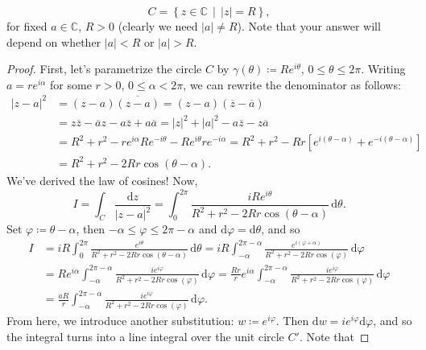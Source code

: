 \documentclass[12pt]{article}
\newcommand{\cx}{\mathbb{C}}
\newcommand\paren[1]{\left( #1 \right)}
\newcommand\setb[1]{\left \{ #1 \right \}}
\newcommand{\sqbrack}[1]{\left [ #1 \right ]}
\newcommand{\abs}[1]{\left| #1 \right|}
\theoremstyle{definition}
\begin{document}
\begin{enumerate}
    \[
        C = \setb{ z \in \cx \, \middle| \, \abs{z} = R } , 
    \]
    for fixed $a \in \cx$, $R > 0$ (clearly we need $|a| \neq R$). Note that your answer will depend on whether $|a| < R$ or $|a| > R$.
    \begin{proof}
        First, let's parametrize the circle $C$ by $\gamma(\theta) \coloneqq Re^{i\theta}$, $0 \leq \theta \leq 2\pi$. Writing $a = re^{i\alpha}$ for some $r > 0$, $0 \leq \alpha < 2\pi$, we can rewrite the denominator as follows:
        \begin{align*}
            \abs{z - a}^2 & = \paren{z - a} \overline{ \paren{ z - a } } = \paren{z - a} \paren{ \overline{z} - \overline{a} } \\ 
            & = z \overline{z} - \overline{a} z - a \overline{z} + a \overline{a} = \abs{z}^2 + \abs{a}^2 - a \overline{z} - z \overline{a} \\ 
            & = R^2 + r^2 - re^{i \alpha} Re^{-i\theta} - Re^{i\theta} re^{-i\alpha} = R^2 + r^2 - Rr \sqbrack{ e^{i \paren{ \theta - \alpha } } + e^{-i \paren{ \theta - \alpha } } } \\ 
            & = R^2 + r^2 - 2Rr \cos \paren{ \theta - \alpha } .
        \end{align*}
        We've derived the law of cosines! Now,
        \[
            I = \int_C \frac{\mathrm{d}z}{\abs{z-a}^2}  = \int_{0}^{2\pi} \frac{i R e^{i\theta}}{R^2 + r^2 -2Rr \cos \paren{ \theta - \alpha } } \, \mathrm{d}\theta.
        \]
        Set $\varphi \coloneqq \theta - \alpha$, then $-\alpha \leq \varphi \leq 2 \pi - \alpha$ and $\mathrm{d}\varphi = \mathrm{d}\theta$, and so 
        \begin{align*}
            I & = i R \int_{0}^{2\pi} \frac{ e^{i\theta}}{R^2 + r^2 -2Rr \cos \paren{ \theta - \alpha } } \, \mathrm{d}\theta = i R \int_{-\alpha}^{2\pi - \alpha} \frac{ e^{i \paren{ \varphi + \alpha } }}{R^2 + r^2 -2Rr \cos \paren{ \varphi } } \, \mathrm{d}\varphi \\ 
            & = R e^{i\alpha} \int_{-\alpha}^{2\pi - \alpha} \frac{ i e^{i \varphi }}{R^2 + r^2 -2Rr \cos \paren{ \varphi } } \, \mathrm{d}\varphi = \frac{Rr}{r} e^{i\alpha} \int_{-\alpha}^{2\pi - \alpha} \frac{ i e^{i \varphi }}{R^2 + r^2 -2Rr \cos \paren{ \varphi } } \, \mathrm{d}\varphi \\ 
            & = \frac{aR}{r}  \int_{-\alpha}^{2\pi - \alpha} \frac{ i e^{i \varphi }}{R^2 + r^2 -2Rr \cos \paren{ \varphi } } \, \mathrm{d}\varphi.
        \end{align*}
        From here, we introduce another substitution: $w \coloneqq e^{i \varphi}$. Then $\mathrm{d}w = i e^{i \varphi} \mathrm{d}\varphi$, and so the integral turns into a line integral over the unit circle $C'$. Note that 

\end{proof}
\end{enumerate}
\end{document}
